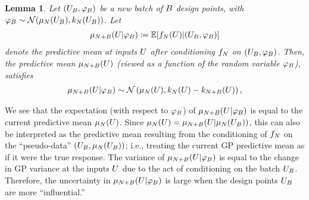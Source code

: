 \documentclass[12pt]{article}
\newtheorem{lemma}{Lemma}
\begin{document}
\begin{lemma} \label{lemma:pred-mean-dist}
Let $(\designBatchIn, \designBatchFunc)$ be a new batch of $\Nbatch$ design points, with 
$\designBatchFunc \sim \Gaussian(\gpMean[\Ndesign](\designBatchIn), \gpKer[\Ndesign](\designBatchIn))$. 
Let  
\begin{align}
\gpMean[\Naugment](\parMat | \designBatchFunc) 
\Def \E[\funcEm[\Ndesign](\parMat) | (\designBatchIn, \designBatchFunc)] \label{conditional-mean-notation}
\end{align}
denote the predictive mean at inputs $\parMat$ after conditioning $\funcEm[\Ndesign]$ on 
$(\designBatchIn, \designBatchFunc)$. Then, the predictive mean $\gpMean[\Naugment](\parMat)$
(viewed as a function of the random variable $\designBatchFunc$), satisfies 
\begin{align}
\gpMean[\Naugment](\parMat | \designBatchFunc)
\sim \Gaussian\left(\gpMean[\Ndesign](\parMat), 
                               \gpKer[\Ndesign](\parMat) - \gpKer[\Naugment](\parMat) \right) \label{pred-mean-dist},
\end{align}
\end{lemma}
We see that the expectation (with respect to $\designBatchFunc$) of $\gpMean[\Naugment](\parMat | \designBatchFunc)$ 
is equal to the current predictive mean $\gpMean[\Ndesign](\parMat)$. Since 
$\gpMean[\Ndesign](\parMat) = \gpMean[\Naugment](\parMat | \gpMean[\Ndesign](\designBatchIn))$, this can also be 
interpreted as the predictive mean resulting from the conditioning of $\funcEm[\Ndesign]$ on the ``pseudo-data''
$(\designBatchIn, \gpMean[\Ndesign](\designBatchIn))$; i.e., treating the current GP predictive mean as if it were 
the true response. The variance of 
$\gpMean[\Naugment](\parMat | \designBatchFunc)$ is equal to the change in GP variance at the inputs $\parMat$ due to the act 
of conditioning on the batch $\designBatchIn$. Therefore, the uncertainty in $\gpMean[\Naugment](\parMat | \designBatchFunc)$ 
is large when the design points $\designBatchIn$ are more ``influential.''
\end{document}
